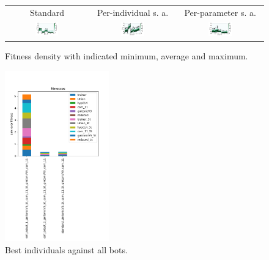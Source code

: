 \documentclass[11pt,a4paper]{scrartcl}
\begin{document}
\begin{figure}[H]
\center
\begin{tabular}{ccc}
Standard & Per-individual s. a. & Per-parameter s. a. \\
\includegraphics[width=0.3\textwidth]{img/standard_gintonicV9_5t_com_11_5t_gintonicV9_com_11.png} &
\includegraphics[width=0.3\textwidth]{img/self_adapt_1_gintonicV9_5t_com_11_5t_gintonicV9_com_11.png} &
\includegraphics[width=0.3\textwidth]{img/self_adapt_2_gintonicV9_5t_com_11_5t_gintonicV9_com_11.png} \\
\end{tabular}
\caption{Fitness density with indicated minimum, average and maximum.}
\label{fig:changing opponent}
\end{figure}

\begin{figure}[H]
\center
\includegraphics[width=0.4\textwidth]{img/change.png}
\caption{Best individuals against all bots.}
\label{fig:change}
\end{figure}
\end{document}

